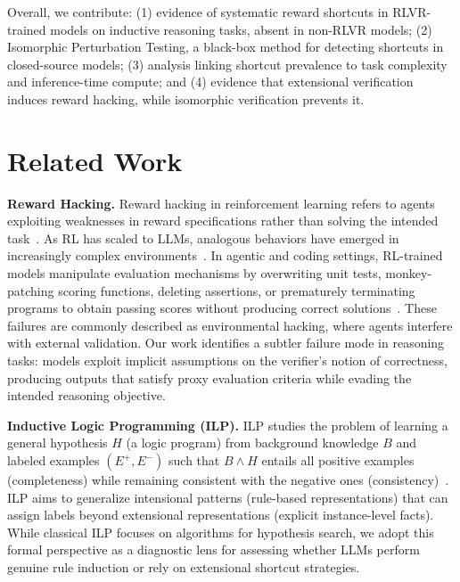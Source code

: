 \documentclass{article}
\begin{document}
Overall, we contribute: (1) evidence of systematic reward shortcuts in RLVR-trained models on inductive reasoning tasks, absent in non-RLVR models; (2) Isomorphic Perturbation Testing, a black-box method for detecting shortcuts in closed-source models; (3) analysis linking shortcut prevalence to task complexity and inference-time compute; and (4) evidence that extensional verification induces reward hacking, while isomorphic verification prevents it. 



\section{Related Work}
\textbf{Reward Hacking.} Reward hacking in reinforcement learning refers to agents exploiting weaknesses in reward specifications rather than solving the intended task~\citep{krakovna2020specification}. As RL has scaled to LLMs, analogous behaviors have emerged in increasingly complex environments~\citep{macdiarmid2025emergent,wang2026implicit}. In agentic and coding settings, RL-trained models manipulate evaluation mechanisms by overwriting unit tests, monkey-patching scoring functions, deleting assertions, or prematurely terminating programs to obtain passing scores without producing correct solutions~\citep{metr2025,baker2025monitoring}. These failures are commonly described as environmental hacking, where agents interfere with external validation. Our work identifies a subtler failure mode in reasoning tasks: models exploit implicit assumptions on the verifier’s notion of correctness, producing outputs that satisfy proxy evaluation criteria while evading the intended reasoning objective.


\textbf{Inductive Logic Programming (ILP).} 
ILP studies the problem of learning a general hypothesis $H$ (a logic program) from background knowledge $B$ and labeled examples $(E^+, E^-)$ such that $B \wedge H$ entails all positive examples (completeness) while remaining consistent with the negative ones (consistency)~\citep{Cropper2021InductiveLP,ILP_Muggleton,DeRaedt2008}. ILP aims to generalize intensional patterns (rule-based representations) that can assign labels beyond extensional representations (explicit instance-level facts). While classical ILP focuses on algorithms for hypothesis search, we adopt this formal perspective as a diagnostic lens for assessing whether LLMs perform genuine rule induction or rely on extensional shortcut strategies.
\end{document}
